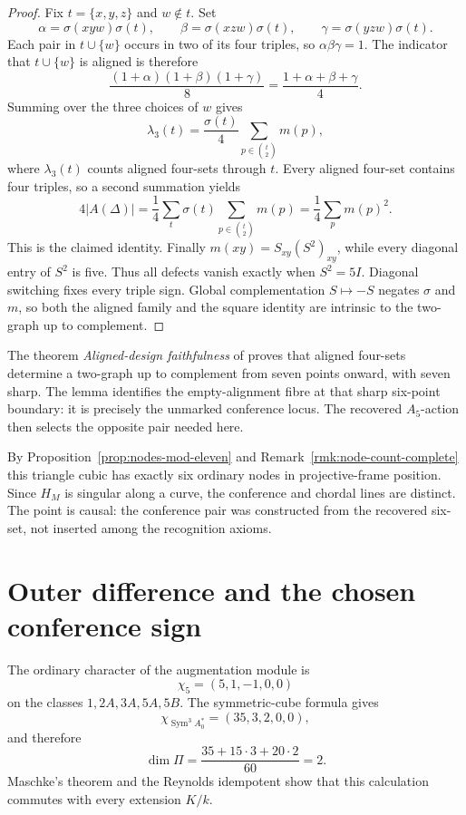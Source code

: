 \documentclass[11pt]{article}
\theoremstyle{definition}
\theoremstyle{remark}
\newcommand{\Sym}{\operatorname{Sym}}
\begin{document}
\begin{proof}
Fix \(t=\{x,y,z\}\) and \(w\notin t\).  Set
\[
 \alpha=\sigma(xyw)\sigma(t),\qquad
 \beta=\sigma(xzw)\sigma(t),\qquad
 \gamma=\sigma(yzw)\sigma(t).
\]
Each pair in \(t\cup\{w\}\) occurs in two of its four triples, so
\(\alpha\beta\gamma=1\).  The indicator that \(t\cup\{w\}\) is aligned is
therefore
\[
 \frac{(1+\alpha)(1+\beta)(1+\gamma)}8
   =\frac{1+\alpha+\beta+\gamma}{4}.
\]
Summing over the three choices of \(w\) gives
\[
 \lambda_3(t)
   =\frac{\sigma(t)}4\sum_{p\in\binom t2}m(p),
\]
where \(\lambda_3(t)\) counts aligned four-sets through \(t\).  Every aligned
four-set contains four triples, so a second summation yields
\[
4|A(\Delta)|
  =\frac14\sum_t\sigma(t)\sum_{p\in\binom t2}m(p)
  =\frac14\sum_p m(p)^2.
\]
This is the claimed identity.  Finally
\(m(xy)=S_{xy}(S^2)_{xy}\), while every diagonal entry of \(S^2\) is five.
Thus all defects vanish exactly when \(S^2=5I\).
Diagonal switching fixes every triple sign.  Global complementation
\(S\mapsto-S\) negates \(\sigma\) and \(m\), so both the aligned family and
the square identity are intrinsic to the two-graph up to complement.
\end{proof}

The theorem \emph{Aligned-design faithfulness} of \cite{RuddPassages2026}
proves that aligned four-sets determine a two-graph up to complement from
seven points onward, with seven sharp.  The lemma identifies the
empty-alignment fibre at that sharp six-point boundary: it is precisely the
unmarked conference locus.  The recovered \(A_5\)-action then selects the
opposite pair needed here.

By Proposition~\ref{prop:nodes-mod-eleven} and
Remark~\ref{rmk:node-count-complete} this triangle cubic has exactly six
ordinary nodes in projective-frame position.  Since \(H_M\) is singular along a curve,
the conference and chordal lines are distinct.  The point is causal: the
conference pair was constructed from the recovered six-set, not inserted
among the recognition axioms.

\section{Outer difference and the chosen conference sign}
\label{sec:outer-companion}

The ordinary character of the augmentation module is
\[
                    \chi_5=(5,1,-1,0,0)
\]
on the classes \(1,2A,3A,5A,5B\).  The symmetric-cube formula gives
\[
       \chi_{\Sym^3 A_0^*}=(35,3,2,0,0),
\]
and therefore
\[
 \dim\Pi=\frac{35+15\cdot3+20\cdot2}{60}=2.
\]
Maschke's theorem and the Reynolds idempotent show that this calculation
commutes with every extension \(K/k\).
\end{document}
